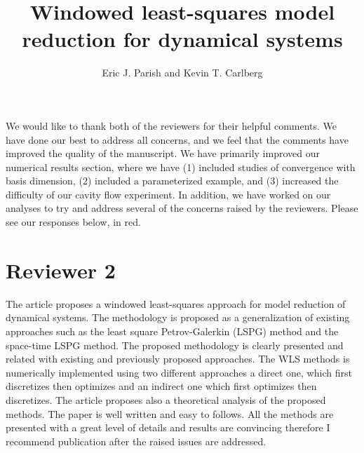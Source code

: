 \documentclass[3p,computermodern,10pt]{elsarticle}
\begin{document}
\begin{frontmatter}

\title{Windowed least-squares model reduction for dynamical systems}

\author[a]{Eric J. Parish and Kevin T. Carlberg}

\address[a]{Sandia National Laboratories,  Livermore, CA}
\end{frontmatter}


We would like to thank both of the reviewers for their helpful comments. We have done our best to address all concerns, and we feel that the comments have improved the quality of the manuscript. We have primarily improved our numerical results section, where we have (1) included studies of convergence with basis dimension, (2) included a parameterized example, and (3) increased the difficulty of our cavity flow experiment. In addition, we have worked on our analyses to try and address several of the concerns raised by the reviewers. Please see our responses below, in red.
\section{Reviewer 2}
The article proposes a windowed least-squares approach for model reduction of dynamical systems. The methodology is proposed as a generalization of existing approaches such as the least square Petrov-Galerkin (LSPG) method and the space-time LSPG method. The proposed methodology is clearly presented and related with existing and previously proposed approaches. The WLS methods is numerically implemented using two different approaches a direct one, which first discretizes then optimizes and an indirect one which first optimizes then discretizes. The article proposes also a theoretical analysis of the proposed methods. The paper is well written and easy to follows. All the methods are presented with a great level of details and results are convincing therefore I recommend publication after the raised issues are addressed.
\end{document}
